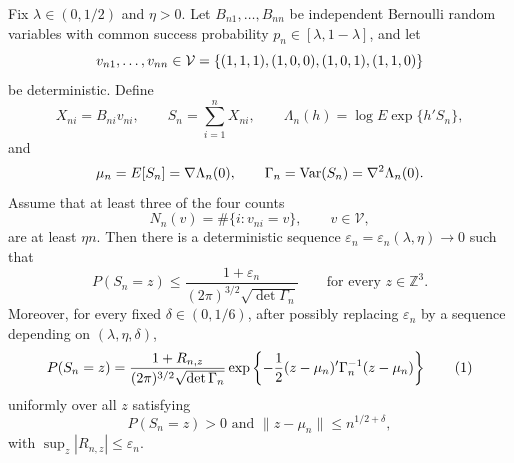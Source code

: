 \documentclass[12pt,reqno]{amsart}
\begin{document}
\begin{prop}\label{prop:lattice}
Fix \(\lambda\in(0,1/2)\) and \(\eta>0\).  Let
\(B_{n1},\ldots,B_{nn}\) be independent Bernoulli random variables with common
success probability \(p_n\in[\lambda,1-\lambda]\), and let
\[v_{n1},\ldots,v_{nn}\in\mathcal V = \left\{{(1,1,1), (1,0,0), (1,0,1), (1,1,0)}\right\}\]
be deterministic. Define
\[
X_{ni}=B_{ni}v_{ni},\qquad
S_n=\sum_{i=1}^nX_{ni},\qquad
\Lambda_n(h)=\log E\exp\{h'S_n\},
\]
and
\[
\mu_n=E[S_n]=\nabla\Lambda_n(0),\qquad
\Gamma_n = \mathop{}\!\textnormal{Var}(S_n) =\nabla^2\Lambda_n(0).
\]
Assume that at least three of the four counts
\[
N_n(v)=\#\{i:v_{ni}=v\},\qquad v\in\mathcal V,
\]
are at least \(\eta n\).  Then there is a deterministic sequence
\(\varepsilon_n=\varepsilon_n(\lambda,\eta)\to0\) such that
\[
P(S_n=z)
\le
\frac{1+\varepsilon_n}{(2\pi)^{3/2}\sqrt{\det\Gamma_n}}
\qquad\text{for every }z\in\mathbb Z^3.
\]
Moreover, for every fixed \(\delta\in(0,1/6)\), after possibly replacing
\(\varepsilon_n\) by a sequence depending on \((\lambda,\eta,\delta)\),
\[
P(S_n=z)
=
\frac{1+R_{n,z}}{(2\pi)^{3/2}\sqrt{\det\Gamma_n}}
\exp\left\{-\frac12(z-\mu_n)'\Gamma_n^{-1}(z-\mu_n)\right\} \numberthis
\label{eq:localexpansion}
\]
uniformly over all \(z\) satisfying
\[
P(S_n=z) > 0 \text{ and } \|z-\mu_n\|\le n^{1/2+\delta},
\]
with \(\sup_z |R_{n,z}|\le\varepsilon_n\).
\end{prop}
\end{document}
